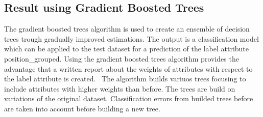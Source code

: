 \subsection{Result using Gradient Boosted Trees}


The gradient boosted trees algorithm is used to create an ensemble of decision trees trough gradually improved estimations. The output is a classification model which can be applied to the test dataset for a prediction of the label attribute position\_grouped. Using the gradient boosted trees algorithm provides the advantage that a written report about the weights of attributes with respect to the label attribute is created.~\cite{ref_rapidminergbt}
The algorithm builds variuos trees focusing to include attributes with higher weights than before. The trees are build on variations of the original dataset. Classification errors from builded trees before are taken into account before building a new tree. ~\cite{ref_towardsGBT}

